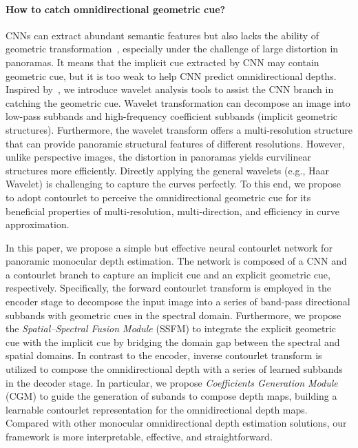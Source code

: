 \documentclass[10pt,times,mathptm,psfig,twocolumn,journals]{IEEEtran}
\begin{document}
\paragraph{How to catch omnidirectional geometric cue?}
CNNs can extract abundant semantic features but also lacks the ability of geometric transformation~\cite{MengkunLiu2021CCNNCC}, especially under the challenge of large distortion in panoramas. It means that the implicit cue extracted by CNN may contain geometric cue, but it is too weak to help CNN predict omnidirectional depths.
Inspired by~\cite{ramamonjisoa2021single}, we introduce wavelet analysis tools to assist the CNN branch in catching the geometric cue. Wavelet transformation can decompose an image into low-pass subbands and high-frequency coefficient subbands (implicit geometric structures). Furthermore, the wavelet transform offers a multi-resolution structure that can provide panoramic structural features of different resolutions. However, unlike perspective images, the distortion in panoramas yields curvilinear structures more efficiently. Directly applying the general wavelets (e.g., Haar Wavelet) is challenging to capture the curves perfectly.
To this end, we propose to adopt contourlet to perceive the omnidirectional geometric cue for its beneficial properties of multi-resolution, multi-direction, and efficiency in curve approximation.
  
In this paper, we propose a simple but effective neural contourlet network for panoramic monocular depth estimation. 
The network is composed of a CNN and a contourlet branch to capture an implicit cue and an explicit geometric cue, respectively. Specifically, the forward contourlet transform is employed in the encoder stage to decompose the input image into a series of band-pass directional subbands with geometric cues in the spectral domain. Furthermore, we propose the \textit{Spatial–Spectral Fusion Module} (SSFM) to integrate the explicit geometric cue with the implicit cue by bridging the domain gap between the spectral and spatial domains. In contrast to the encoder, inverse contourlet transform is utilized to compose the omnidirectional depth with a series of learned subbands in the decoder stage. In particular, we propose \textit{Coefficients Generation Module} (CGM) to guide the generation of subands 
to compose depth maps, building a learnable contourlet representation for the omnidirectional depth maps. Compared with other monocular omnidirectional depth estimation solutions, our framework is more interpretable, effective, and straightforward.
 
\end{document}
